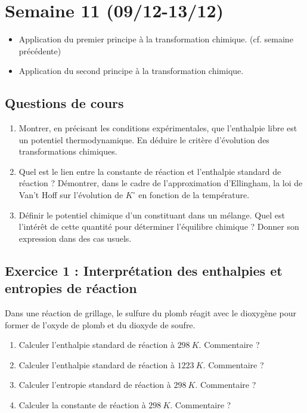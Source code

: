 \section{Semaine 11 (09/12-13/12) }

\begin{itemize}
	\item Application du premier principe à la transformation chimique. (cf. semaine précédente)
	\item Application du second principe à la transformation chimique.
\end{itemize}

\subsection{Questions de cours}

\begin{enumerate}
	\item Montrer, en précisant les conditions expérimentales, que l'enthalpie libre est un potentiel thermodynamique. En déduire le critère d'évolution des transformations chimiques.
	\item Quel est le lien entre la constante de réaction et l'enthalpie standard de réaction ? Démontrer, dans le cadre de l'approximation d'Ellingham, la loi de Van't Hoff sur l'évolution de $K^\circ$ en fonction de la température.
	\item Définir le potentiel chimique d'un constituant dans un mélange. Quel est l'intérêt de cette quantité pour déterminer l'équilibre chimique ? Donner son expression dans des cas usuels.
\end{enumerate}

\subsection{Exercice 1 : Interprétation des enthalpies et entropies de réaction}

Dans une réaction de grillage, le sulfure du plomb réagit avec le dioxygène pour former de l'oxyde de plomb et du dioxyde de soufre.

\begin{enumerate}
	\item Calculer l'enthalpie standard de réaction à $\SI{298}{K}$. Commentaire ?
	\item Calculer l'enthalpie standard de réaction à $\SI{1223}{K}$. Commentaire ?
	\item Calculer l'entropie standard de réaction à $\SI{298}{K}$. Commentaire ?
	\item Calculer la constante de réaction à $\SI{298}{K}$. Commentaire ?
\end{enumerate}

